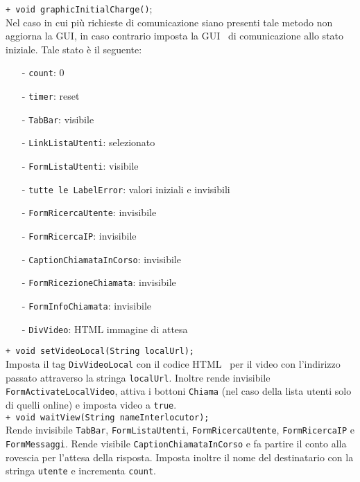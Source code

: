 {\begin{sloppypar}
{{\begin{itemize}
				\texttt{+ void graphicInitialCharge()};\\
				Nel caso in cui più richieste di comunicazione siano presenti tale metodo non aggiorna la GUI\g, in caso 
				contrario imposta la GUI\g~ di comunicazione allo stato iniziale. Tale stato è il seguente:
				\begin{itemize}
					\item[-] \texttt{count}: 0
					\item[-] \texttt{timer}: reset
					\item[-] \texttt{TabBar}: visibile
					\item[-] \texttt{LinkListaUtenti}: selezionato
					\item[-] \texttt{FormListaUtenti}: visibile
					\item[-] \texttt{tutte le LabelError}: valori iniziali e invisibili
					\item[-] \texttt{FormRicercaUtente}: invisibile
					\item[-] \texttt{FormRicercaIP}: invisibile
					\item[-] \texttt{CaptionChiamataInCorso}: invisibile
					\item[-] \texttt{FormRicezioneChiamata}: invisibile
					\item[-] \texttt{FormInfoChiamata}: invisibile
					\item[-] \texttt{DivVideo}: HTML immagine di attesa\\
				\end{itemize}

				\texttt{+ void setVideoLocal(String localUrl);}\\
				Imposta il tag \texttt{DivVideoLocal} con il codice HTML\g~ per il video con l'indirizzo passato attraverso la stringa \texttt{localUrl}.
				Inoltre rende invisibile \texttt{FormActivateLocalVideo}, attiva i bottoni \texttt{Chiama} (nel caso della lista utenti solo di quelli online) e imposta video a \texttt{true}.\\

				\texttt{+ void waitView(String nameInterlocutor);}\\
				Rende invisibile \texttt{TabBar}, \texttt{FormListaUtenti}, \texttt{FormRicercaUtente}, \texttt{FormRicercaIP} e \texttt{FormMessaggi}. 
				Rende visibile \texttt{CaptionChiamataInCorso} e fa partire il conto alla rovescia per l'attesa della risposta. 
				Imposta inoltre il nome del destinatario con la stringa \texttt{utente} e incrementa \texttt{count}.\\


\end{itemize}}}
\end{sloppypar}}
